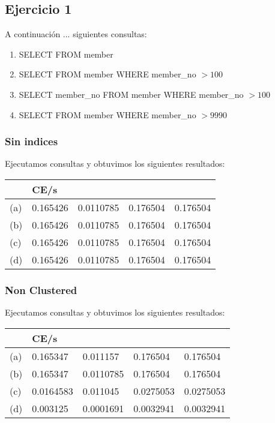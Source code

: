 \subsection{Ejercicio 1}

A continuación ... siguientes consultas:
\begin{enumerate}[label=(\alph*)]
\item{SELECT \* FROM member}

\item{SELECT \* FROM member WHERE member\_no $> 100$}

\item{SELECT member\_no FROM member WHERE member\_no $> 100$}

\item{SELECT FROM member WHERE member\_no $> 9990$}

\end{enumerate}

\subsubsection{Sin indices}	

Ejecutamos consultas y obtuvimos los siguientes resultados:

\begin{tabular}{| L | L | L | L | L |}
    \hline
     & CE/s &  &  &  \\ \hline
	(a)	& 0.165426 & 0.0110785 & 0.176504 & 0.176504 \\ \hline
	(b)	& 0.165426 & 0.0110785 & 0.176504 &	0.176504 \\ \hline
	(c) & 0.165426 & 0.0110785 & 0.176504 &	0.176504 \\ \hline
	(d) & 0.165426 & 0.0110785 & 0.176504 &	0.176504 \\ \hline
\end{tabular}


\subsubsection{Non Clustered}

Ejecutamos consultas y obtuvimos los siguientes resultados:

\begin{tabular}{| L | L | L | L | L |}
    \hline
     & CE/s &  &  &  \\ \hline
    (a) & 0.165347 & 0.011157 & 0.176504 & 0.176504 \\ \hline
    (b) & 0.165347 & 0.0110785 & 0.176504 & 0.176504 \\ \hline
    (c) & 0.0164583 & 0.011045 & 0.0275053 & 0.0275053 \\ \hline
    (d) & 0.003125 & 0.0001691 & 0.0032941 & 0.0032941 \\ \hline    
\end{tabular}
	
